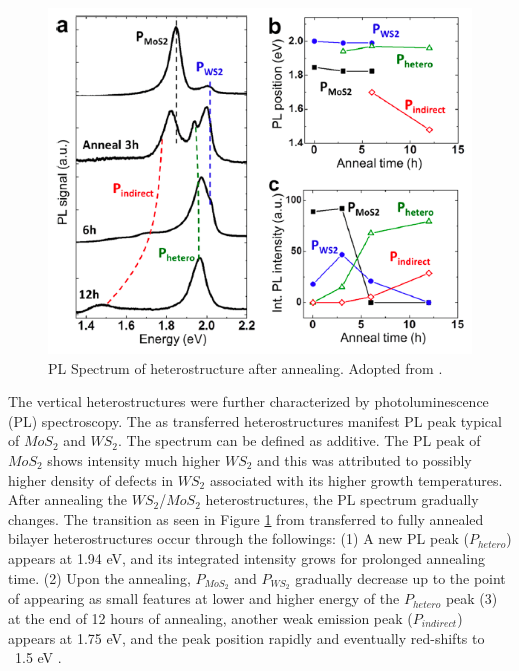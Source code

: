 \begin{figure}[H]
	\begin{center}
		\includegraphics[scale=0.9]{Heterostructures/HeterostructurePLSpectrumIntro.png}
		\caption{PL Spectrum of heterostructure after annealing. Adopted from \cite{Tongay2014}.}
		\label{fig:HeterostructurePLSpectrumIntro}
	\end{center}
\end{figure}

The vertical heterostructures were further characterized by photoluminescence (PL) spectroscopy. The as transferred heterostructures manifest PL peak typical of $MoS_2$ and $WS_2$. The spectrum can be defined as additive. The PL peak of $MoS_2$ shows intensity much higher $WS_2$ and this was attributed to possibly higher density of defects in $WS_2$ associated with its higher growth temperatures. After annealing the $WS_2$/$MoS_2$ heterostructures, the PL spectrum gradually changes. The transition as seen in Figure \ref{fig:HeterostructurePLSpectrumIntro} from transferred to fully annealed bilayer heterostructures occur through the followings: (1) A new PL peak ($P_{hetero}$) appears at 1.94 eV, and its integrated intensity grows for prolonged annealing time. (2) Upon the annealing, $P_{MoS_2}$ and $P_{WS_2}$ gradually decrease up to the point of appearing as small features at lower and higher energy of the $P_{hetero}$ peak (3) at the end of 12 hours of annealing, another weak emission peak ($P_{indirect}$) appears at 1.75 eV, and the peak position rapidly and eventually red-shifts to ~1.5 eV \cite{Tongay2014}. 

